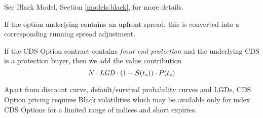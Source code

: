 See Black Model, Section \ref{models:black}, for more details.
 
\medskip

If the option underlying contains an upfront spread, this is 
converted into a corresponding running spread adjustment.

\medskip
If the CDS Option contract contains {\em front end protection} and the
underlying CDS is a protection buyer, then we add the value contribution
$$
N\cdot \mathit{LGD}\cdot (1-S(t_s))\cdot P(t_s)
$$

\medskip
Apart from discount curve, default/survival probability curves and
LGDs, CDS Option pricing requires Black volatilities which may be
available only for index CDS Options for a limited range of indices
and short expiries.

